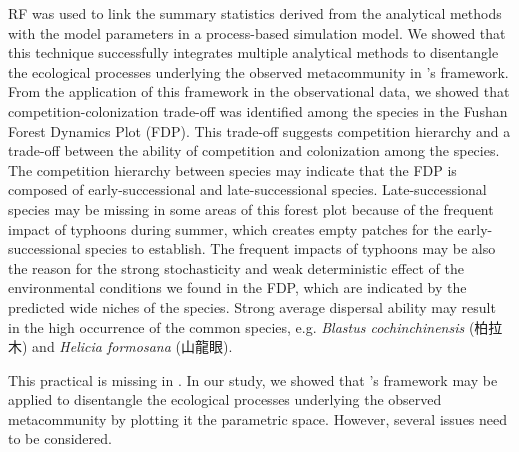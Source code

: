 RF was used to link the summary statistics derived from the analytical methods with the model parameters in a process-based simulation model. We showed that this technique successfully integrates multiple analytical methods to disentangle the ecological processes underlying the observed metacommunity in \citeauthor{guzman2022accounting}'s framework. From the application of this framework in the observational data, we showed that competition-colonization trade-off was identified among the species in the Fushan Forest Dynamics Plot (FDP). This trade-off suggests competition hierarchy and a trade-off between the ability of competition and colonization among the species. The competition hierarchy between species may indicate that the FDP is composed of early-successional and late-successional species. Late-successional species may be missing in some areas of this forest plot because of the frequent impact of typhoons during summer, which creates empty patches for the early-successional species to establish. The frequent impacts of typhoons may be also the reason for the strong stochasticity and weak deterministic effect of the environmental conditions we found in the FDP, which are indicated by the predicted wide niches of the species. Strong average dispersal ability may result in the high occurrence of the common species, e.g. \textit{Blastus cochinchinensis} (柏拉木) and \textit{Helicia formosana} (山龍眼). 

This practical \DIFdelbegin {}\DIFdelend \DIFaddbegin {}\DIFaddend is missing in \citet{guzman2022accounting}. In our study, we showed that \citeauthor{guzman2022accounting}'s framework may be applied to disentangle the ecological processes underlying the observed metacommunity by plotting it \DIFdelbegin {}\DIFdelend \DIFaddbegin {}\DIFaddend the parametric space. However, several issues need to be considered.

